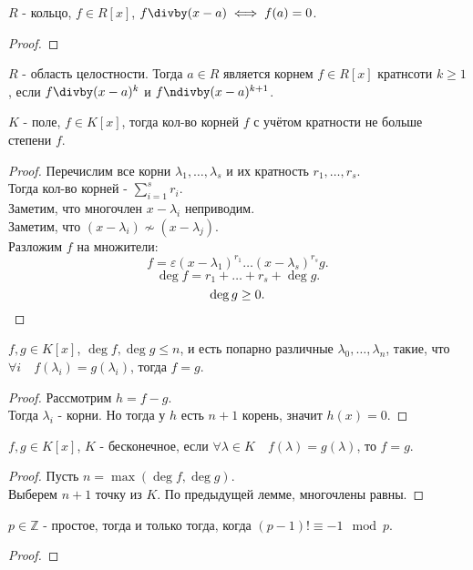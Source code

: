 \documentclass[11pt, oneside]{article}   	%
\begin{document}
    \begin{tlemma}
        $R$ - кольцо, $f\in R[x]$, $f\divby(x-a) \iff f(a)=0$.
        \begin{proof}
        \end{proof}
    \end{tlemma}
    \begin{definition}
    $R$ - область целостности. Тогда $a\in R$ является корнем $f\in R[x]$ кратнсоти $k \ge 1$, если $f\divby (x-a)^{k}$ и $f\ndivby(x-a)^{k+1}$.
    \end{definition}
    \begin{theorem}
        $K$ -  поле, $f\in K[x]$, тогда кол-во корней $f$ с учётом кратности не больше степени $f$.
        \begin{proof}
            Перечислим все корни $\lambda_1, \ldots, \lambda_s$ и их кратность $r_1, \ldots, r_s$.\\
            Тогда кол-во корней - $\sum\limits_{i=1}^{s}r_i$.\\
            Заметим, что многочлен $x-\lambda_i$ неприводим.\\
            Заметим, что $(x-\lambda_i) \not\sim (x-\lambda_j)$.\\
            Разложим $f$ на множители:
            \[ f = \varepsilon (x-\lambda_1)^{r_1} \ldots (x-\lambda_s)^{r_s}g .\]
            \[ \deg f = r_1 + \ldots +  r_s + \deg g .\]
            \[ \deg g \ge  0 .\qedhere\] 
        \end{proof}
    \end{theorem}
    \begin{tlemma}
        $f,g\in K[x]$, $\deg f, \deg g \le n$, и есть попарно различные $\lambda_0, \ldots, \lambda_n$, такие, что $\forall{i}\quad f(\lambda_i) = g(\lambda_i)$, тогда $f=g$.\\
        \begin{proof}
            Рассмотрим $h=f-g$.\\
            Тогда $\lambda_i$ - корни. Но тогда у $h$ есть $n+1$ корень, значит $h(x) = 0$.
        \end{proof}
    \end{tlemma}
    \begin{theorem}
        $f, g\in K[x]$, $K$ - бесконечное, если $\forall{\lambda\in K}\quad f(\lambda) = g(\lambda)$, то $f=g$.
        \begin{proof}
            Пусть $n = \max(\deg f, \deg g)$.\\
            Выберем $n+1$ точку из $K$. По предыдущей лемме, многочлены равны.
        \end{proof}
    \end{theorem}
    \begin{theorem}
        $p\in \mathbb{Z}$ - простое, тогда и только тогда, когда $(p-1)! \equiv -1 \mod p$.\\
        \begin{proof}
        \end{proof}
    \end{theorem}
\end{document}
